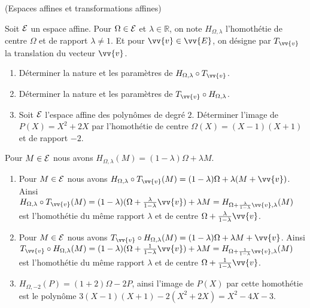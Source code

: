 \documentclass[a4paper,12pt,reqno]{amsart}
\begin{document}
\sisujet{\bigskip}
\begin{exo} (Espaces affines et transformations affines)

  Soit $\mathcal{E}$ un espace affine. Pour $\Omega \in \mathcal{E}$ et $\lambda \in \mathbb{R}$, on note $H_{\Omega,\lambda}$ l'homothétie de centre $\Omega$ et de rapport $\lambda \neq 1$. Et pour $\vv{v} \in \vv{E}$, on désigne par $T_{\vv{v}}$ la translation du vecteur $\vv{v}$.
  \begin{enumerate}
    \item Déterminer la nature et les paramètres de $H_{\Omega,\lambda}\circ T_{\vv{v}}$.
    \item Déterminer la nature et les paramètres de $T_{\vv{v}}\circ H_{\Omega,\lambda}$.
    \item Soit $\mathcal{E}$ l'espace affine des polynômes de degré $2$. Déterminer l'image de $P(X)=X^{2}+2X$ par l'homothétie de centre $\Omega(X) = (X-1)(X+1)$ et de rapport $-2$.
  \end{enumerate}

\end{exo}

\begin{solution}

  Pour $M \in  \mathcal{E}$ nous avons $H_{\Omega,\lambda}(M) = (1-\lambda)\Omega + \lambda M$.
  \begin{enumerate}
    \item Pour $M \in  \mathcal{E}$ nous avons $H_{\Omega,\lambda}\circ T_{\vv{v}}(M) = (1-\lambda)\Omega + \lambda (M+\vv{v})$. Ainsi $H_{\Omega,\lambda}\circ T_{\vv{v}}(M) = (1-\lambda)(\Omega + \frac{\lambda}{1-\lambda}\vv{v}) + \lambda M = H_{\Omega + \frac{\lambda}{1-\lambda}\vv{v},\lambda}(M)$ est l'homothétie du même rapport $\lambda$ et de centre $\Omega + \frac{\lambda}{1-\lambda}\vv{v}$.
    \item Pour $M \in  \mathcal{E}$ nous avons $T_{\vv{v}}\circ H_{\Omega,\lambda} (M) = (1-\lambda)\Omega + \lambda M+\vv{v}$. Ainsi $T_{\vv{v}} \circ H_{\Omega,\lambda}(M) = (1-\lambda)(\Omega + \frac{1}{1-\lambda}\vv{v}) + \lambda M = H_{\Omega + \frac{1}{1-\lambda}\vv{v},\lambda}(M)$ est l'homothétie du même rapport $\lambda$ et de centre $\Omega + \frac{1}{1-\lambda}\vv{v}$.
    \item $H_{\Omega,-2}(P) = (1+2)\Omega-2P$, ainsi l'image de $P(X)$ par cette homothétie est le polynôme $3(X-1)(X+1)-2(X^{2}+2X) = X^{2}-4X-3$.

  \end{enumerate}
\end{solution}
\end{document}
